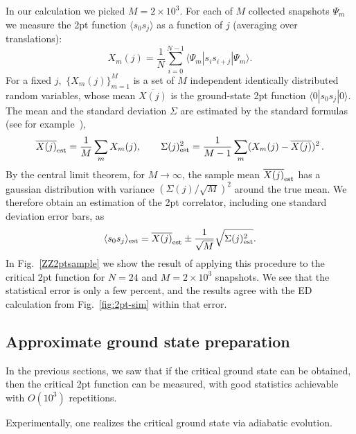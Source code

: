 \documentclass[a4paper,11pt]{article}
\theoremstyle{remark}
\theoremstyle{theorem}
\begin{document}
In our calculation we picked $M = 2 \times 10^3$. For each of $M$ collected
snapshots $\Psi_m$ we measure the 2pt function $\langle s_0 s_j
\rangle$ as a function of $j$ (averaging over translations):
\begin{equation}
	\label{sample} X_m (j) = \frac{1}{N}  \sum_{i = 0}^{N - 1} \langle \Psi_m
	|s_i s_{i + j} | \Psi_m \rangle .
\end{equation}
For a fixed $j,$ $\{ X_m (j) \}_{m = 1}^M$ is a set of $M$ independent
identically distributed random variables, whose mean $\overline{X (j)}$ is the
ground-state 2pt function $\langle 0| s_0 s_j |0 \rangle$. The mean and the
standard deviation $\Sigma$ are estimated by the standard formulas (see for example~\cite{Taylor1997ErrorAnalysis}),
\begin{equation}
	\overline{X (j)}_{\rm est} = \frac{1}{M}  \sum_m X_m (j), \qquad \Sigma
	(j)^2_{\rm est} = \frac{1}{M - 1}  \sum_m (X_m (j) - \overline{X (j)})^2
	\hspace{0.17em} .
\end{equation}
By the central limit theorem, for $M \to \infty$, the sample mean $\overline{X
	(j)}_{\rm est}$ has a gaussian distribution with variance $(\Sigma (j) /
\sqrt{M})^2$ around the true mean. We therefore obtain an estimation of the
2pt correlator, including one standard deviation error bars, as
\begin{equation}
	\langle s_0 s_j \rangle_{\rm est} = \overline{X (j)}_{\rm est} \pm
	\frac{1}{\sqrt{M}}  \sqrt{\Sigma (j)^2_{\rm est}} . \label{eq:conf}
\end{equation}
In Fig.~\ref{ZZ2ptsample} we show the result of applying this procedure to the
critical 2pt function for $N = 24$ and $M = 2 \times 10^3$ snapshots. We see
that the statistical error is only a few percent, and the results agree with the ED calculation from Fig.~\ref{fig:2pt-sim} within that error.

\subsection{Approximate ground state preparation}
\label{sec:fidelity}
In the previous sections, we saw that if the
critical ground state can be obtained, then the critical 2pt function can be
measured, with good statistics achievable with $O (10^3)$ repetitions. 

Experimentally, one realizes the critical ground state via adiabatic
evolution.
\end{document}
